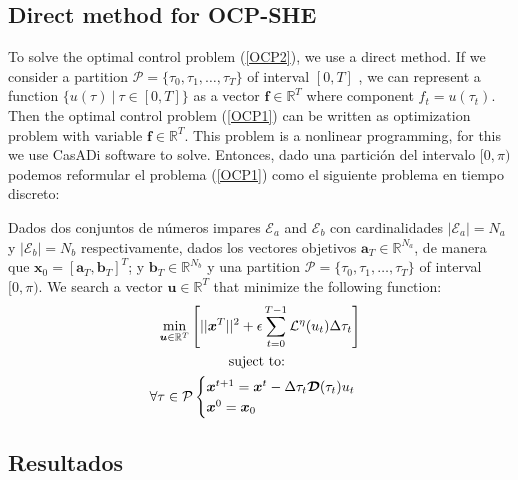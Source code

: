 \subsection{Direct method  for  OCP-SHE}

To solve the optimal control problem (\ref{OCP2}), we use a direct method. 
If we consider a partition $\mathcal{P} = \{\tau_0,\tau_1,\dots,\tau_{T}\}$ of interval $[0,T]$ , we can represent a function $\{ u(\tau) \ | \ \tau \in [0,T]\}$ as a vector $\bm{f} \in \mathbb{R}^{T}$ where component $f_t = u(\tau_t)$. Then the optimal control problem (\ref{OCP1}) can be written as optimization problem with variable $\bm{f} \in \mathbb{R}^{T}$. This problem is a nonlinear programming, for this we use CasADi software to solve. Entonces, dado una partición del intervalo $[0,\pi)$ podemos reformular el problema (\ref{OCP1}) como el siguiente problema en tiempo discreto:

\begin{problem}
    Dados dos conjuntos de números impares $\mathcal{E}_a$ and $\mathcal{E}_b$ con cardinalidades $|\mathcal{E}_a| = N_a$ y  $|\mathcal{E}_b| = N_b$ respectivamente, dados los vectores objetivos $\bm{a}_T  \in \mathbb{R}^{N_a}$, de manera que $\bm{x}_0 = [\bm{a}_T,\bm{b}_T]^T$; y $\bm{b}_T  \in \mathbb{R}^{N_b}$ y una  partition $\mathcal{P} = \{\tau_0,\tau_1,\dots,\tau_{T}\}$ of interval $[0,\pi)$. We search a vector $\bm{u} \in \mathbb{R}^{T}$ that minimize the following function:
    \begin{gather}
        \min_{\bm{u} \in \mathbb{R}^{T} } 
        \Bigg[ 
        || \bm{x}^{T}||^2
        + \epsilon  \sum_{t=0}^{T-1} \mathcal{L}^\eta(u_{t}) \Delta\tau_t  \Bigg]  \\
        \notag \text{suject to: } \\
        \forall \tau \in \mathcal{P} \begin{cases}
            \bm{x}^{t+1} = \bm{x}^{t} - \Delta \tau_t \bm{\mathcal{D}}(\tau_t)u_t \\
            \bm{x}^0 = \bm{x}_0
        \end{cases} 
    \end{gather}
\end{problem}



\subsection{Resultados}


